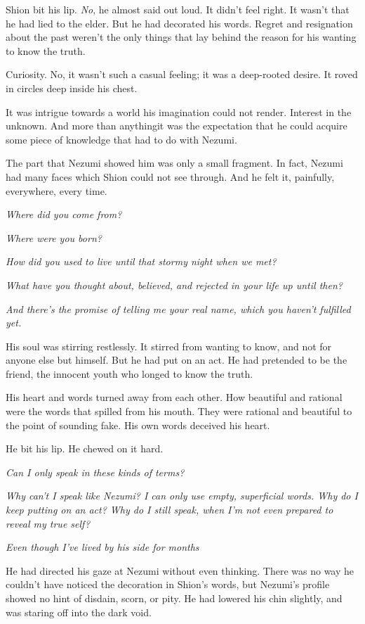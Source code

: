 Shion bit his lip. \emph{No}, he almost said out loud. It didn't feel right. It
wasn't that he had lied to the elder. But he had decorated his words.
Regret and resignation about the past weren't the only things that lay
behind the reason for his wanting to know the truth.

Curiosity. No, it wasn't such a casual feeling; it was a deep-rooted
desire. It roved in circles deep inside his chest.

It was intrigue towards a world his imagination could not render.
Interest in the unknown. And more than anything\el it was the
expectation that he could acquire some piece of knowledge that had to do
with Nezumi.

The part that Nezumi showed him was only a small fragment. In fact,
Nezumi had many faces which Shion could not see through. And he felt it,
painfully, everywhere, every time.

\emph{Where did you come from?}

\emph{Where were you born?}

\emph{How did you used to live until that stormy night when we met?}

\emph{What have you thought about, believed, and rejected in your life up
until then?}

\emph{And there's the promise of telling me your real name, which you haven't
fulfilled yet.}

His soul was stirring restlessly. It stirred from wanting to know, and
not for anyone else but himself. But he had put on an act. He had
pretended to be the friend, the innocent youth who longed to know the
truth.

His heart and words turned away from each other. How beautiful and
rational were the words that spilled from his mouth. They were rational
and beautiful to the point of sounding fake. His own words deceived his
heart.

He bit his lip. He chewed on it hard.

\emph{Can I only speak in these kinds of terms?}

\emph{Why can't I speak like Nezumi? I can only use empty, superficial words.
Why do I keep putting on an act? Why do I still speak, when I'm not even
prepared to reveal my true self?}

\emph{Even though I've lived by his side for months\el }

He had directed his gaze at Nezumi without even thinking. There was no
way he couldn't have noticed the decoration in Shion's words, but
Nezumi's profile showed no hint of disdain, scorn, or pity. He had
lowered his chin slightly, and was staring off into the dark void.

